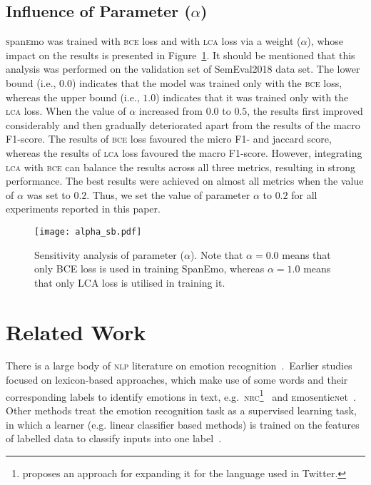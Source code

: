 \documentclass[11pt,a4paper]{article}
\begin{document}
\subsection{Influence of Parameter ($\alpha$)}\label{alpha_sec}
\textsc{s}pan\textsc{e}mo was trained with \textsc{bce} loss and with \textsc{lca} loss via a weight ($\alpha$), whose impact on the results is presented in Figure~\ref{alpha}. It should be mentioned that this analysis was performed on the validation set of SemEval2018 data set. The lower bound (i.e., $0.0$) indicates that the model was trained only with the \textsc{bce} loss, whereas the upper bound (i.e., $1.0$) indicates that it was trained only with the \textsc{lca} loss. When the value of $\alpha$ increased from $0.0$ to $0.5$, the results first improved considerably and then gradually deteriorated apart from the results of the macro F1-score. The results of \textsc{bce} loss favoured the micro F1- and jaccard score, whereas the results of \textsc{lca} loss favoured the macro F1-score. However, integrating \textsc{lca} with \textsc{bce} can balance the results across all three metrics, resulting in strong performance. The best results were achieved on almost all metrics when the value of $\alpha$ was set to $0.2$. Thus, we set the value of parameter $\alpha$ to $0.2$ for all experiments reported in this paper. 

\begin{figure}[ht]
   \texttt{[image: alpha\_sb.pdf]}
  \caption{Sensitivity analysis of parameter ($\alpha$). Note that $\alpha = 0.0$ means that only BCE loss is used in training SpanEmo, whereas $\alpha = 1.0$ means that only LCA loss is utilised in training it.}\label{alpha}
\end{figure}


\section{Related Work}\label{RW} 
There is a large body of \textsc{nlp} literature on emotion recognition~\cite{mohammad2015computational}.~Earlier studies focused on lexicon-based approaches, which make use of some words and their corresponding labels to identify emotions in text, e.g.~\textsc{nrc}\footnote{ proposes an approach for expanding it for the language used in Twitter.}~\cite{Mohammad13} and \textsc{e}mo\textsc{s}entic\textsc{n}et~\cite{poria2014emosenticspace}. Other methods treat the emotion recognition task as a supervised learning task, in which a learner (e.g. linear classifier based methods) is trained on the features of labelled data to classify inputs into one label~\cite{Bostan2018,Liew2016,mohammad2015sentiment,tang2013learning,wang2012harnessing,aman2007identifying}. 
\end{document}
